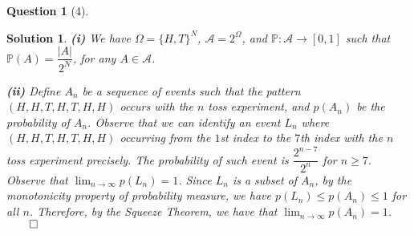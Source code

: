 \documentclass{article} %
\theoremstyle{quest}
\newtheorem*{question}{Question}
\newtheorem*{solution}{Solution}
\begin{document}
\bigskip

\begin{question}[4]
\end{question}
\begin{solution}
\textbf{(i)} We have $\Omega = \{H,T \}^N$, $\mathscr{A} = 2^{\Omega}$,
and $\mathbb{P}:\mathscr{A} \to [0,1]$ such that 
$\mathbb{P}(A) = \dfrac{|A|}{2^N}$, for any $A \in \mathscr{A}$.

\smallskip

\textbf{(ii)} Define $A_n$ be a sequence of events such that
the pattern $(H,H,T,H,T,H,H)$ occurs with the $n$ toss experiment,
and $p(A_n)$ be the probability of $A_n$. Observe that we can identify
an event $L_n$ where 
$(H,H,T,H,T,H,H)$ occurring from the $1$st index to the $7$th
index with the $n$ toss experiment precisely. The probability of
such event is $\dfrac{2^{n-7}}{2^n}$ for $n \geq 7$. Observe that
$\lim_{n \to \infty} p(L_n) = 1$. Since $L_n$ is a subset of $A_n$,
by the monotonicity property of probability measure, we have
$p(L_n) \leq p(A_n) \leq 1$ for all $n$. Therefore, by the Squeeze 
Theorem, we have that $\lim_{n \to \infty} p(A_n) = 1$. $\qed$ 
 

\end{solution}
\end{document}
